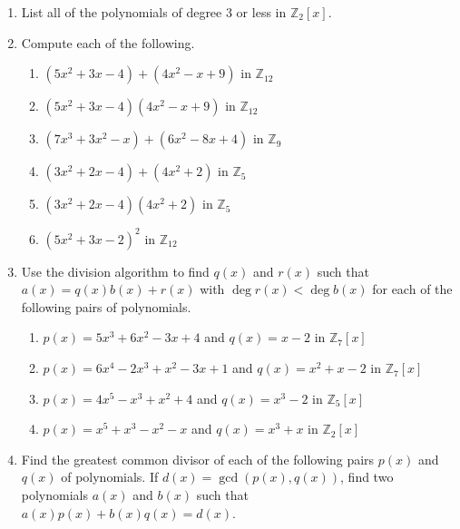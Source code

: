 {\small
\begin{enumerate}

\item
List all of the polynomials of degree 3 or less in ${\mathbb Z}_2[x]$.

\item
Compute each of the following.
\begin{enumerate}
 
 \item
$(5x^2 + 3x - 4) + (4x^2 - x + 9)$ in ${\mathbb Z}_{12}$
 
 \item
$(5x^2 + 3x - 4) (4x^2 - x + 9)$ in ${\mathbb Z}_{12}$
 
 \item
$(7x^3 + 3x^2 - x) + (6x^2 - 8x + 4)$ in ${\mathbb Z}_9$
 
 \item
$(3x^2 + 2x - 4) + (4x^2 + 2)$ in ${\mathbb Z}_5$
  
 \item
$(3x^2 + 2x - 4) (4x^2 + 2)$ in ${\mathbb Z}_5$
 
 \item
$(5x^2 + 3x - 2)^2$ in ${\mathbb Z}_{12}$
 
\end{enumerate}

\item
Use the division algorithm to find $q(x)$ and $r(x)$ such that $a(x) = q(x) b(x) + r(x)$ with $\deg r(x) < \deg b(x)$ for each of the following  pairs of polynomials.  
\begin{enumerate}
 
 \item
$p(x) = 5 x^3 + 6x^2 -  3 x + 4$ and $q(x) = x - 2$ in ${\mathbb Z}_7[x]$
 
 \item
$p(x) = 6 x^4 - 2 x^3 +  x^2 - 3 x + 1$ and $q(x) = x^2 + x - 2$ in ${\mathbb Z}_7[x]$
 
 \item
$p(x) = 4 x^5 - x^3 + x^2 + 4$ and $q(x) = x^3 - 2$ in ${\mathbb Z}_5[x]$ 
 
 \item
$p(x) = x^5 + x^3 -x^2 - x$ and $q(x) = x^3 + x$ in ${\mathbb Z}_2[x]$
 
\end{enumerate}

\item
Find the greatest common divisor of each of the following pairs $p(x)$ and $q(x)$ of polynomials. If $d(x) = \gcd( p(x), q(x) )$, find two polynomials $a(x)$ and $b(x)$ such that $a(x) p(x) + b(x) q(x) = d(x)$. 
\begin{enumerate}
 

\end{enumerate}
\end{enumerate}}
